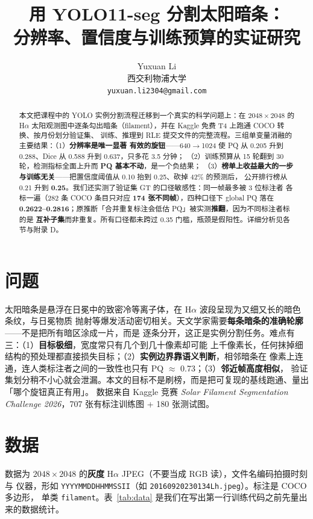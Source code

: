 \documentclass{article}
\title{用 YOLO11-seg 分割太阳暗条：\\分辨率、置信度与训练预算的实证研究}
\author{%
  Yuxuan Li \\
  西交利物浦大学 \\
  \texttt{yuxuan.li2304@gmail.com} \\
}
\begin{document}
\maketitle

\begin{abstract}
本文把课程中的 YOLO 实例分割流程迁移到一个真实的科学问题上：在 $2048\times2048$ 的 H$\alpha$
太阳观测图中逐条勾出暗条（filament），并在 Kaggle 免费 T4 上跑通 COCO 转换、按月份划分验证集、
训练、推理到 RLE 提交文件的完整流程。三组单变量消融的主要结果：（1）\textbf{分辨率是唯一显著
有效的旋钮}——640$\to$1024 使 PQ 从 0.205 升到 0.288、Dice 从 0.588 升到 0.637，只多花 3.5 分钟；
（2）训练预算从 15 轮翻到 30 轮，检测指标全面上升而 \textbf{PQ 基本不动}，是一个负结果；
（3）\textbf{榜单上收益最大的一步与训练无关}——把置信度阈值从 0.10 抬到 0.25、砍掉 42\% 的预测后，
公开排行榜从 0.21 升到 \textbf{0.25}。我们还实测了验证集 GT 的口径敏感性：同一帧最多被 3 位标注者
各标一遍（282 条 COCO 条目只对应 \textbf{174 张不同帧}），四种口径下 global PQ 落在
\textbf{0.2622--0.2816}；原推断「合并重复标注会低估 PQ」被实测\textbf{推翻}，因为不同标注者标的是
\textbf{互补子集}而非重复。所有口径都未跨过 0.35 门槛，瓶颈是假阳性。详细分析见各节与附录 D。
\end{abstract}

\section{问题}
太阳暗条是悬浮在日冕中的致密冷等离子体，在 H$\alpha$ 波段呈现为又细又长的暗色条纹，与日冕物质
抛射等爆发活动密切相关。天文学家需要\textbf{每条暗条的准确轮廓}——不是把所有暗区涂成一片，而是
逐条分开，这正是实例分割任务。难点有三：（1）\textbf{目标极细}，宽度常只有几个到几十像素却可能
上千像素长，任何抹掉细结构的预处理都直接损失目标；（2）\textbf{实例边界靠语义判断}，相邻暗条在
像素上连通，连人类标注者之间的一致性也只有 PQ $\approx$ 0.73；（3）\textbf{邻近帧高度相似}，
验证集划分稍不小心就会泄漏。本文的目标不是刷榜，而是把可复现的基线跑通、量出「哪个旋钮真正有用」。
数据来自 Kaggle 竞赛 \emph{Solar Filament Segmentation Challenge 2026}，707 张有标注训练图 +
180 张测试图。

\section{数据}
\label{sec:data}
数据为 $2048\times2048$ 的\textbf{灰度} H$\alpha$ JPEG（不要当成 RGB 读），文件名编码拍摄时刻与
仪器，形如 \texttt{YYYYMMDDHHMMSSII}（如 \texttt{20160920230134Lh.jpeg}）。标注是 COCO 多边形，
单类 \texttt{filament}。表~\ref{tab:data} 是我们在写出第一行训练代码之前先量出来的数据统计。
\end{document}
